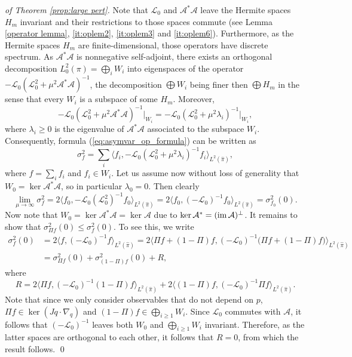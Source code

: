 \begin{proof}[of Theorem \ref{prop:large pert}]
	Note that $\mathcal{L}_{0}$ and $\mathcal{A}^{*}\mathcal{A}$ leave the Hermite spaces $H_m$ invariant and their restrictions to those spaces commute 
	(see Lemma \ref{operator lemma}, \ref{it:oplem2}, \ref{it:oplem3} and \ref{it:oplem6}). Furthermore, as the Hermite spaces $H_m$ are finite-dimensional, those operators have discrete spectrum. As $\mathcal{A}^{*}\mathcal{A}$
	is nonnegative self-adjoint, there exists an orthogonal
	decomposition $L_{0}^{2}(\pi)=\bigoplus_{i}W_{i}$  into eigenspaces of the operator $-\mathcal{L}_{0}(\mathcal{L}_{0}^{2}+\mu^{2}\mathcal{A}^{*}\mathcal{A})^{-1}$,
	the decomposition $\bigoplus W_i$ being finer then $\bigoplus H_m$ in the sense that every $W_i$ is a subspace of some $H_m$. 
	 Moreover,
	\[
	-\mathcal{L}_{0}(\mathcal{L}_{0}^{2}+\mu^{2}\mathcal{A}^{*}\mathcal{A})^{-1}\vert_{W_{i}}=-\mathcal{L}_{0}(\mathcal{L}_{0}^{2}+\mu^{2}\lambda_{i})^{-1}\vert_{W_i},
	\]
	where $\lambda_{i}\ge0$ is the eigenvalue of $\mathcal{A}^{*}\mathcal{A}$
	associated to the subspace $W_{i}$. Consequently, formula (\ref{eq:asymvar_op_formula})
	can be written as 
	\begin{equation}
	\label{eq:asymvar_spectral}
	\sigma_{f}^{2}=\sum_{i}\langle f_{i},-\mathcal{L}_{0}(\mathcal{L}_{0}^{2}+\mu^{2}\lambda_{i})^{-1}f_{i}\rangle_{L^{2}(\widehat{\pi})},
	\end{equation}
	where $f=\sum_{i}f_{i}$ and $f_{i}\in W_{i}$. Let us assume now
	without loss of generality that $W_{0}=\ker\mathcal{A}^{*}\mathcal{A}$,
	so in particular $\lambda_{0}=0$. Then clearly 
	\[
	\lim_{\mu\rightarrow\infty}\sigma_{f}^{2}=2\langle f_{0},-\mathcal{L}_{0}(\mathcal{L}_{0}^{2})^{-1}f_{0}\rangle_{L^{2}(\widehat{\pi})}=2\langle f_{0},(-\mathcal{L}_{0})^{-1}f_{0}\rangle_{L^{2}(\widehat{\pi})}=\sigma_{f_{0}}^{2}(0).
	\]
	Now note that $W_{0}=\ker\mathcal{A}^{*}\mathcal{A}=\ker\mathcal{A}$ due
	to $\ker\mathcal{A}^{*}=(\operatorname{im}\mathcal{A})^{\perp}$.  It remains to show that  $\sigma_{\Pi f}^{2}(0)\le\sigma_{f}^{2}(0)$.  To see this, we write 
	\begin{align*}
	\sigma_{f}^{2}(0) & =2\langle f,(-\mathcal{L}_{0})^{-1}f\rangle_{L^{2}(\widehat{\pi})}=2\langle\Pi f+(1-\Pi)f,(-\mathcal{L}_{0})^{-1}\big(\Pi f+(1-\Pi)f\big)\rangle_{L^{2}(\widehat{\pi})}\\
	& =\sigma_{\Pi f}^{2}(0)+\sigma_{(1-\Pi)f}^{2}(0)+R,
	\end{align*}
	where 
	\[
	R=2\langle\Pi f,(-\mathcal{L}_{0})^{-1}(1-\Pi)f\rangle_{L^{2}(\widehat{\pi})}+2\langle(1-\Pi)f,(-\mathcal{L}_{0})^{-1}\Pi f\rangle_{L^{2}(\widehat{\pi})}.
	\]
	Note that since we only consider observables that do not depend on $p$, $\Pi f\in \ker (Jq\cdot \nabla_q)$ and $(1-\Pi)f\in\bigoplus_{i\ge1}W_{i}$.
	Since $\mathcal{L}_{0}$ commutes with $\mathcal{A}$, it follows
	that $(-\mathcal{L}_{0})^{-1}$ leaves both $W_{0}$ and $\bigoplus_{i\ge1}W_{i}$
	invariant. Therefore, as the latter spaces are orthogonal to each
	other, it follows that $R=0$, from which the result follows. 
	\qed
\end{proof}
